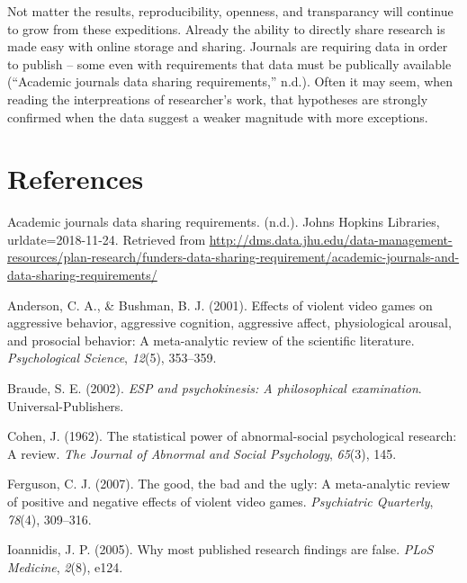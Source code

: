 \documentclass[man]{apa6}
\theoremstyle{definition}
\theoremstyle{definition}
\theoremstyle{definition}
\theoremstyle{remark}
\begin{document}
Not matter the results, reproducibility, openness, and transparancy will
continue to grow from these expeditions. Already the ability to directly
share research is made easy with online storage and sharing. Journals
are requiring data in order to publish -- some even with requirements
that data must be publically available (``Academic journals data sharing
requirements,'' n.d.). Often it may seem, when reading the
interpreations of researcher's work, that hypotheses are strongly
confirmed when the data suggest a weaker magnitude with more exceptions.

\newpage

\hypertarget{references}{%
\section{References}\label{references}}

\begingroup
\setlength{\parindent}{-0.5in}
\setlength{\leftskip}{0.5in}

\hypertarget{refs}{}
\leavevmode\hypertarget{ref-jhl2018academic}{}%
Academic journals data sharing requirements. (n.d.). Johns Hopkins
Libraries, urldate=2018-11-24. Retrieved from
\url{http://dms.data.jhu.edu/data-management-resources/plan-research/funders-data-sharing-requirement/academic-journals-and-data-sharing-requirements/}

\leavevmode\hypertarget{ref-anderson2001effects}{}%
Anderson, C. A., \& Bushman, B. J. (2001). Effects of violent video
games on aggressive behavior, aggressive cognition, aggressive affect,
physiological arousal, and prosocial behavior: A meta-analytic review of
the scientific literature. \emph{Psychological Science}, \emph{12}(5),
353--359.

\leavevmode\hypertarget{ref-braude2002esp}{}%
Braude, S. E. (2002). \emph{ESP and psychokinesis: A philosophical
examination}. Universal-Publishers.

\leavevmode\hypertarget{ref-cohen1962statistical}{}%
Cohen, J. (1962). The statistical power of abnormal-social psychological
research: A review. \emph{The Journal of Abnormal and Social
Psychology}, \emph{65}(3), 145.

\leavevmode\hypertarget{ref-ferguson2007good}{}%
Ferguson, C. J. (2007). The good, the bad and the ugly: A meta-analytic
review of positive and negative effects of violent video games.
\emph{Psychiatric Quarterly}, \emph{78}(4), 309--316.

\leavevmode\hypertarget{ref-ioannidis2005why}{}%
Ioannidis, J. P. (2005). Why most published research findings are false.
\emph{PLoS Medicine}, \emph{2}(8), e124.
\end{document}
